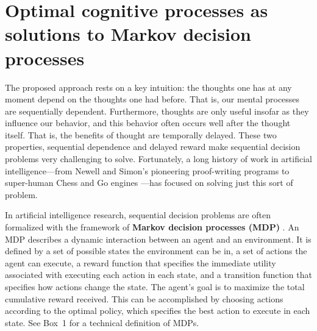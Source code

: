 \section{Optimal cognitive processes as solutions to Markov decision processes}

The proposed approach rests on a key intuition: the thoughts one has at any moment depend on the thoughts one had before. That is, our mental processes are sequentially dependent. Furthermore, thoughts are only useful insofar as they influence our behavior, and this behavior often occurs well after the thought itself. That is, the benefits of thought are temporally delayed. These two properties, sequential dependence and delayed reward make sequential decision problems very challenging to solve. Fortunately, a long history of work in artificial intelligence---from Newell and Simon's pioneering proof-writing programs \citep{newell1956logic} to super-human Chess and Go engines \citep{silver2017mastering}---has focused on solving just this sort of problem.

In artificial intelligence research, sequential decision problems are often formalized with the framework of \textbf{Markov decision processes (MDP)} \citep{puterman2014markov,sutton2018reinforcement}. An MDP describes a dynamic interaction between an agent and an environment. It is defined by a set of possible states the environment can be in, a set of actions the agent can execute, a reward function that specifies the immediate utility associated with executing each action in each state, and a transition function that specifies how actions change the state. The agent's goal is to maximize the total cumulative reward received. This can be accomplished by choosing actions according to the optimal policy, which specifies the best action to execute in each state. See Box~1 for a technical definition of MDPs.


